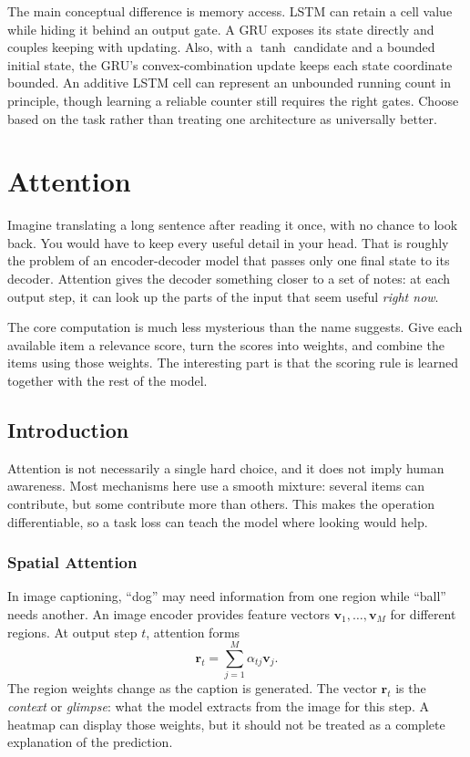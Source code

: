 \documentclass[11pt, oneside]{book}
\let\originalsection\section
\renewcommand{\section}{\Needspace{7\baselineskip}\originalsection}
\let\originalsubsection\subsection
\renewcommand{\subsection}{\Needspace{6\baselineskip}\originalsubsection}
\begin{document}
The main conceptual difference is memory access. LSTM can retain a cell value while hiding it behind an output gate. A GRU exposes its state directly and couples keeping with updating. Also, with a $\tanh$ candidate and a bounded initial state, the GRU's convex-combination update keeps each state coordinate bounded. An additive LSTM cell can represent an unbounded running count in principle, though learning a reliable counter still requires the right gates. Choose based on the task rather than treating one architecture as universally better.

\chapter{Attention}\label{ch:source-4}

Imagine translating a long sentence after reading it once, with no chance to look back. You would have to keep every useful detail in your head. That is roughly the problem of an encoder-decoder model that passes only one final state to its decoder. Attention gives the decoder something closer to a set of notes: at each output step, it can look up the parts of the input that seem useful \emph{right now}.

The core computation is much less mysterious than the name suggests. Give each available item a relevance score, turn the scores into weights, and combine the items using those weights. The interesting part is that the scoring rule is learned together with the rest of the model.

\section{Introduction}\label{sec:source-4-1}
Attention is not necessarily a single hard choice, and it does not imply human awareness. Most mechanisms here use a smooth mixture: several items can contribute, but some contribute more than others. This makes the operation differentiable, so a task loss can teach the model where looking would help.

\subsection{Spatial Attention}\label{sec:source-4-1-1}
In image captioning, ``dog'' may need information from one region while ``ball'' needs another. An image encoder provides feature vectors $\mathbf{v}_1,\ldots,\mathbf{v}_M$ for different regions. At output step $t$, attention forms
\[
 \mathbf{r}_t=\sum_{j=1}^{M}\alpha_{tj}\mathbf{v}_j.
\]
The region weights change as the caption is generated. The vector $\mathbf{r}_t$ is the \emph{context} or \emph{glimpse}: what the model extracts from the image for this step. A heatmap can display those weights, but it should not be treated as a complete explanation of the prediction.
\end{document}
